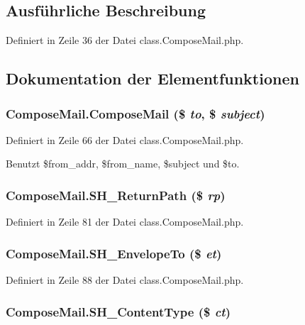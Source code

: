 \subsection{Ausführliche Beschreibung}


Definiert in Zeile 36 der Datei class.ComposeMail.php.

\subsection{Dokumentation der Elementfunktionen}
\subsubsection{\setlength{\rightskip}{0pt plus 5cm}ComposeMail.ComposeMail (\$ {\em to}, \$ {\em subject})}\label{classComposeMail_51e733dd915dbae78707383602d15752}




Definiert in Zeile 66 der Datei class.ComposeMail.php.

Benutzt \$from\_\-addr, \$from\_\-name, \$subject und \$to.
\subsubsection{\setlength{\rightskip}{0pt plus 5cm}ComposeMail.SH\_\-ReturnPath (\$ {\em rp})}\label{classComposeMail_410825e8d6bde557b44798c63651e708}




Definiert in Zeile 81 der Datei class.ComposeMail.php.
\subsubsection{\setlength{\rightskip}{0pt plus 5cm}ComposeMail.SH\_\-EnvelopeTo (\$ {\em et})}\label{classComposeMail_510678b8b799e34196326c09b72c95ad}




Definiert in Zeile 88 der Datei class.ComposeMail.php.
\subsubsection{\setlength{\rightskip}{0pt plus 5cm}ComposeMail.SH\_\-ContentType (\$ {\em ct})}\label{classComposeMail_3d114a6e06a063b270014f1819c32a1e}




